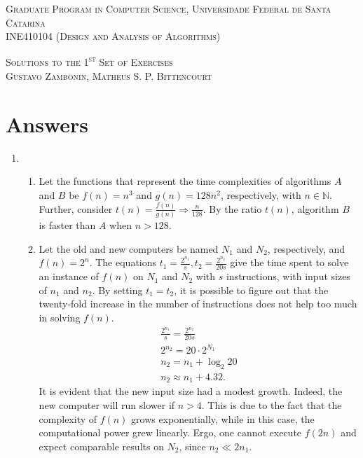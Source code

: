 \documentclass[12pt]{article}
\begin{document}
\textsc{Graduate Program in Computer Science,
  Universidade Federal de Santa Catarina} \\
\textsc{INE410104 (Design and Analysis of Algorithms)}

\textsc{Solutions to the 1\textsuperscript{st} Set of Exercises} \\
\textsc{Gustavo Zambonin, Matheus S. P. Bittencourt}

\section{Answers}

\begin{enumerate}
    \item 
    \begin{enumerate}
        \item Let the functions that represent the time complexities of algorithms $A$ and $B$ be $f(n) = n^{3}$ and $g(n) = 128n^{2}$, respectively, with $n \in \mathbb{N}$. Further, consider $t(n) = \frac{f(n)}{g(n)} \Rightarrow \frac{n}{128}$. By the ratio $t(n)$, algorithm $B$ is faster than $A$ when $n > 128$.
        \item Let the old and new computers be named $N_{1}$ and $N_{2}$, respectively, and $f(n) = 2^{n}$. The equations $t_{1} = \frac{2^{n_{1}}}{s}, t_{2} = \frac{2^{n_{2}}}{20s}$ give the time spent to solve an instance of $f(n)$ on $N_{1}$ and $N_{2}$ with $s$ instructions, with input sizes of $n_{1}$ and $n_{2}$. By setting $t_{1} = t_{2}$, it is possible to figure out that the twenty-fold increase in the number of instructions does not help too much in solving $f(n)$.
        \begin{align*}
            \tfrac{2^{n_{1}}}{s} = \tfrac{2^{n_{2}}}{20s} \\
            2^{n_{2}} = 20 \cdot 2^{N_{1}} \\
            n_{2} = n_{1} + \log_{2} 20 \\
            n_{2} \approx n_{1} + 4.32.
        \end{align*}
        It is evident that the new input size had a modest growth. Indeed, the new computer will run slower if $n > 4$. This is due to the fact that the complexity of $f(n)$ grows exponentially, while in this case, the computational power grew linearly. Ergo, one cannot execute $f(2n)$ and expect comparable results on $N_{2}$, since $n_{2} \ll 2 n_{1}$.
        

\end{enumerate}
\end{enumerate}
\end{document}

